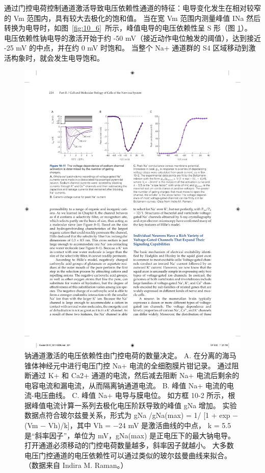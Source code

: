 通过门控电荷控制通道激活导致电压依赖性通道的特征：电导变化发生在相对较窄的 Vm 范围内，具有较大去极化的饱和值。
当在宽 Vm 范围内测量峰值 INa 然后转换为电导时，如图~\ref{fig:10_6}~所示，峰值电导的电压依赖性呈 S 形（图 \ref{fig:10_11}）。
电压依赖性钠电导的激活开始于约 -50 mV（接近动作电位触发的阈值），达到接近 -25 mV 的中点，并在约 0 mV 时饱和。 
当整个 Na+ 通道群的 S4 区域移动到激活构象时，就会发生电导饱和。


\begin{figure}[htbp]
	\centering
	\includegraphics[width=0.9\linewidth]{chap10/fig_10_11}
	\caption{钠通道激活的电压依赖性由门控电荷的数量决定。 A. 在分离的海马锥体神经元中进行电压门控 Na+ 电流的全细胞膜片钳记录。 通过阻断通过 K+ 和 Ca2+ 通道的电流，然后减去阻断 Na+ 电流后剩余的电容电流和漏电流，从而隔离钠通道电流。 B. 峰值 Na+ 电流的电流-电压曲线。 C. 峰值 Na+ 电导与膜电位。 如方框 10-2 所示，根据峰值电流计算一系列去极化电压阶跃导致的峰值 gNa 增加。 实验数据点符合玻尔兹曼关系，形式为 gNa /gNa(max) = 1/ [1 + exp − (Vm − Vh)/k]，其中 Vh = −24 mV 是激活曲线的中点， k = 5.5 是“斜率因子”，单位为 mV，gNa(max) 是正电压下的最大钠电导。 打开通道必须移动的门控电荷数量越多，斜率因子就越小。 大多数电压门控通道的电压依赖性可以通过类似的玻尔兹曼曲线来拟合。 （数据来自 Indira M. Raman。）}
	\label{fig:10_11}
\end{figure}


